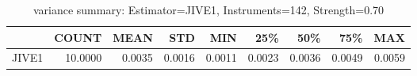 \begin{table}[ht]
\centering
\caption{variance summary: Estimator=JIVE1, Instruments=142, Strength=0.70}
\begin{tabular}{lrrrrrrrr}
\toprule
 & COUNT & MEAN & STD & MIN & 25\% & 50\% & 75\% & MAX \\
\midrule
JIVE1 & 10.0000 & 0.0035 & 0.0016 & 0.0011 & 0.0023 & 0.0036 & 0.0049 & 0.0059 \\
\bottomrule
\end{tabular}
\end{table}
